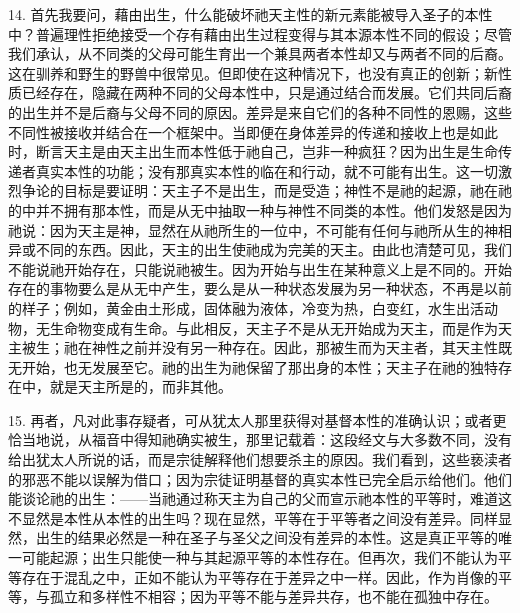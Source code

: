 14. 首先我要问，藉由出生，什么能破坏祂天主性的新元素能被导入圣子的本性中？普遍理性拒绝接受一个存有藉由出生过程变得与其本源本性不同的假设；尽管我们承认，从不同类的父母可能生育出一个兼具两者本性却又与两者不同的后裔。这在驯养和野生的野兽中很常见。但即使在这种情况下，也没有真正的创新；新性质已经存在，隐藏在两种不同的父母本性中，只是通过结合而发展。它们共同后裔的出生并不是后裔与父母不同的原因。差异是来自它们的各种不同性的恩赐，这些不同性被接收并结合在一个框架中。当即便在身体差异的传递和接收上也是如此时，断言天主是由天主出生而本性低于祂自己，岂非一种疯狂？因为出生是生命传递者真实本性的功能；没有那真实本性的临在和行动，就不可能有出生。这一切激烈争论的目标是要证明：天主子不是出生，而是受造；神性不是祂的起源，祂在祂的中并不拥有那本性，而是从无中抽取一种与神性不同类的本性。他们发怒是因为祂说：因为天主是神，显然在从祂所生的一位中，不可能有任何与祂所从生的神相异或不同的东西。因此，天主的出生使祂成为完美的天主。由此也清楚可见，我们不能说祂开始存在，只能说祂被生。因为开始与出生在某种意义上是不同的。开始存在的事物要么是从无中产生，要么是从一种状态发展为另一种状态，不再是以前的样子；例如，黄金由土形成，固体融为液体，冷变为热，白变红，水生出活动物，无生命物变成有生命。与此相反，天主子不是从无开始成为天主，而是作为天主被生；祂在神性之前并没有另一种存在。因此，那被生而为天主者，其天主性既无开始，也无发展至它。祂的出生为祂保留了那出身的本性；天主子在祂的独特存在中，就是天主所是的，而非其他。\par

15. 再者，凡对此事存疑者，可从犹太人那里获得对基督本性的准确认识；或者更恰当地说，从福音中得知祂确实被生，那里记载着：这段经文与大多数不同，没有给出犹太人所说的话，而是宗徒解释他们想要杀主的原因。我们看到，这些亵渎者的邪恶不能以误解为借口；因为宗徒证明基督的真实本性已完全启示给他们。他们能谈论祂的出生：——当祂通过称天主为自己的父而宣示祂本性的平等时，难道这不显然是本性从本性的出生吗？现在显然，平等在于平等者之间没有差异。同样显然，出生的结果必然是一种在圣子与圣父之间没有差异的本性。这是真正平等的唯一可能起源；出生只能使一种与其起源平等的本性存在。但再次，我们不能认为平等存在于混乱之中，正如不能认为平等存在于差异之中一样。因此，作为肖像的平等，与孤立和多样性不相容；因为平等不能与差异共存，也不能在孤独中存在。\par

